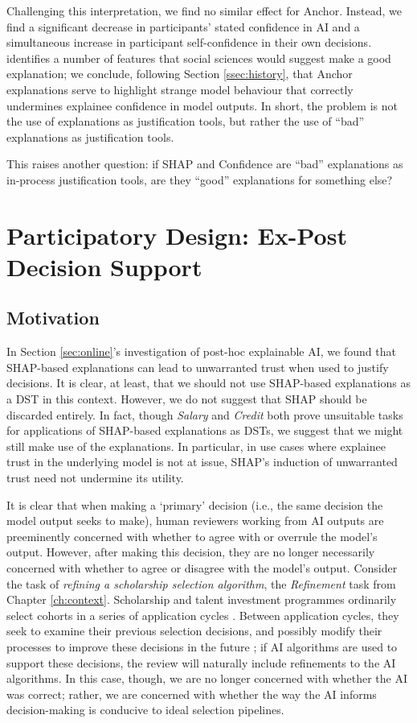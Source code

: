 Challenging this interpretation, we find no similar effect for Anchor. Instead, we find a significant decrease in participants' stated confidence in AI and a simultaneous increase in participant self-confidence in their own decisions. \textcite{miller_explanation_2017} identifies a number of features that social sciences would suggest make a good explanation; we conclude, following Section \ref{ssec:history}, that Anchor explanations serve to highlight strange model behaviour that correctly undermines explainee confidence in model outputs. In short, the problem is not the use of explanations as justification tools, but rather the use of ``bad'' explanations as justification tools.

This raises another question: if SHAP and Confidence are ``bad'' explanations as in-process justification tools, are they ``good'' explanations for something else?

\section[Participatory Design]{Participatory Design: Ex-Post Decision Support}\label{sec:xaicase}
\subsection{Motivation}
In Section \ref{sec:online}'s investigation of post-hoc explainable AI, we found that SHAP-based explanations can lead to unwarranted trust when used to justify decisions. It is clear, at least, that we should not use SHAP-based explanations as a DST in this context. However, we do not suggest that SHAP should be discarded entirely. In fact, though \emph{Salary} and \emph{Credit} both prove unsuitable tasks for applications of SHAP-based explanations as DSTs, we suggest that we might still make use of the explanations. In particular, in use cases where explainee trust in the underlying model is not at issue, SHAP's induction of unwarranted trust need not undermine its utility.

It is clear that when making a `primary' decision (i.e., the same decision the model output seeks to make), human reviewers working from AI outputs are preeminently concerned with whether to agree with or overrule the model's output. However, after making this decision, they are no longer necessarily concerned with whether to agree or disagree with the model's output. Consider the task of \emph{refining a scholarship selection algorithm}, the \emph{Refinement} task from Chapter \ref{ch:context}. Scholarship and talent investment programmes ordinarily select cohorts in a series of application cycles \cite{li2020hiring}. Between application cycles, they seek to examine their previous selection decisions, and possibly modify their processes to improve these decisions in the future \cite{li2020hiring}; if AI algorithms are used to support these decisions, the review will naturally include refinements to the AI algorithms. In this case, though, we are no longer concerned with whether the AI was correct; rather, we are concerned with whether the way the AI informs decision-making is conducive to ideal selection pipelines.

